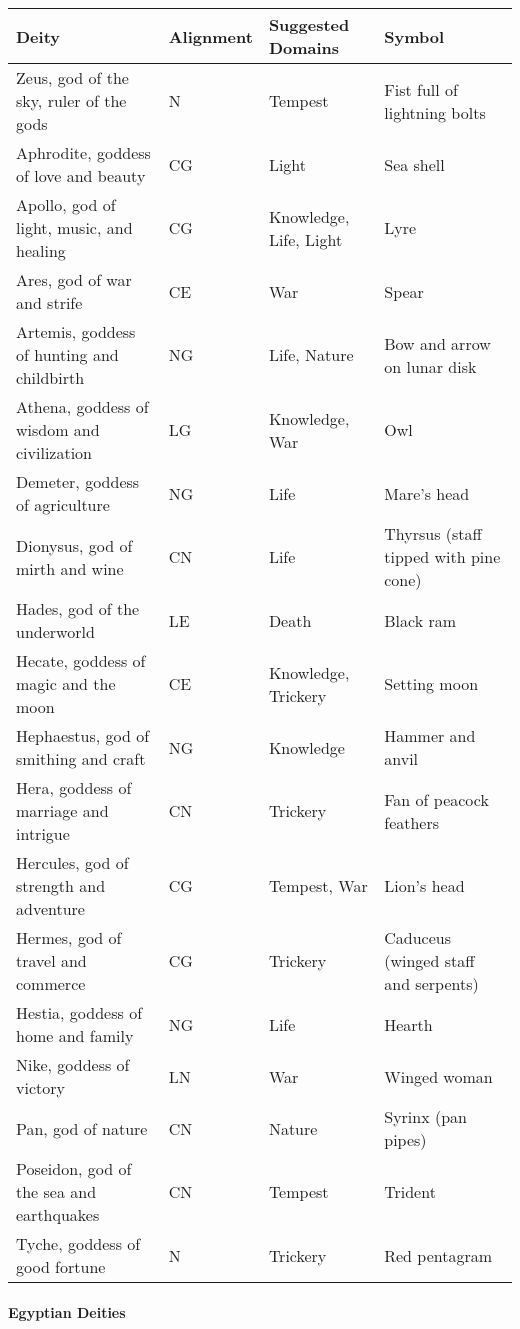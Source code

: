 \documentclass[
]{article}
\begin{document}
\begin{longtable}[]{@{}llll@{}}
\toprule
Deity & Alignment & Suggested Domains & Symbol\tabularnewline
\midrule
\endhead
Zeus, god of the sky, ruler of the gods & N & Tempest & Fist full of
lightning bolts\tabularnewline
Aphrodite, goddess of love and beauty & CG & Light & Sea
shell\tabularnewline
Apollo, god of light, music, and healing & CG & Knowledge, Life, Light &
Lyre\tabularnewline
Ares, god of war and strife & CE & War & Spear\tabularnewline
Artemis, goddess of hunting and childbirth & NG & Life, Nature & Bow and
arrow on lunar disk\tabularnewline
Athena, goddess of wisdom and civilization & LG & Knowledge, War &
Owl\tabularnewline
Demeter, goddess of agriculture & NG & Life & Mare's head\tabularnewline
Dionysus, god of mirth and wine & CN & Life & Thyrsus (staff tipped with
pine cone)\tabularnewline
Hades, god of the underworld & LE & Death & Black ram\tabularnewline
Hecate, goddess of magic and the moon & CE & Knowledge, Trickery &
Setting moon\tabularnewline
Hephaestus, god of smithing and craft & NG & Knowledge & Hammer and
anvil\tabularnewline
Hera, goddess of marriage and intrigue & CN & Trickery & Fan of peacock
feathers\tabularnewline
Hercules, god of strength and adventure & CG & Tempest, War & Lion's
head\tabularnewline
Hermes, god of travel and commerce & CG & Trickery & Caduceus (winged
staff and serpents)\tabularnewline
Hestia, goddess of home and family & NG & Life & Hearth\tabularnewline
Nike, goddess of victory & LN & War & Winged woman\tabularnewline
Pan, god of nature & CN & Nature & Syrinx (pan pipes)\tabularnewline
Poseidon, god of the sea and earthquakes & CN & Tempest &
Trident\tabularnewline
Tyche, goddess of good fortune & N & Trickery & Red
pentagram\tabularnewline
\bottomrule
\end{longtable}

\hypertarget{egyptian-deities}{%
\paragraph{Egyptian Deities}\label{egyptian-deities}}
\end{document}
